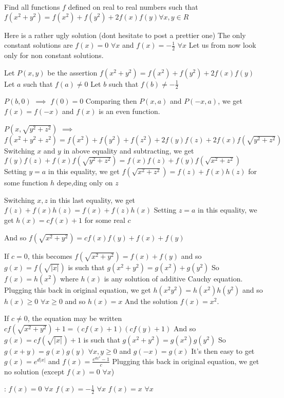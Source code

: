 \begin{solution}
	\begin{tcolorbox}Find all functions $f$ defined on real to real numbers  such that
$f(x^2+y^2)=f(x^2)+f(y^2)+2f(x)f(y) \forall x, y \in  R$\end{tcolorbox}
Here is a rather ugly solution (dont hesitate to post a prettier one)
The only constant solutions are $f(x)=0$ $\forall x$ and $f(x)=-\frac 12$ $\forall x$
Let us from now look only for non constant solutions.

Let $P(x,y)$ be the assertion $f(x^2+y^2)=f(x^2)+f(y^2)+2f(x)f(y)$
Let $a$ such that $f(a)\ne 0$
Let $b$ such that $f(b)\ne -\frac 12$

$P(b,0)$ $\implies$ $f(0)=0$
Comparing then $P(x,a)$ and $P(-x,a)$, we get $f(x)=f(-x)$ and $f(x)$ is an even function.

$P(x,\sqrt{y^2+z^2})$ $\implies$ $f(x^2+y^2+z^2)=f(x^2)+f(y^2)+f(z^2)+2f(y)f(z)+2f(x)f(\sqrt{y^2+z^2})$
Switching $x$ and $y$ in above equality and subtracting, we get $f(y)f(z)+f(x)f(\sqrt{y^2+z^2})=f(x)f(z)+f(y)f(\sqrt{x^2+z^2})$
Setting $y=a$ in this equality, we get $f(\sqrt{x^2+z^2})=f(z)+f(x)h(z)$ for some function $h$ depe,ding only on $z$

Switching $x,z$ in this last equality, we get $f(z)+f(x)h(z)=f(x)+f(z)h(x)$
Setting $z=a$ in this equality, we get $h(x)=cf(x)+1$ for some real $c$

And so $f(\sqrt{x^2+y^2})=cf(x)f(y)+f(x)+f(y)$

If $c=0$, this becomes $f(\sqrt{x^2+y^2})=f(x)+f(y)$ and so $g(x)=f(\sqrt {|x|})$ is such that $g(x^2+y^2)=g(x^2)+g(y^2)$
So $f(x)=h(x^2)$ where $h(x)$ is any solution of additive Cauchy equation.
Plugging this back in original equation, we get $h(x^2y^2)=h(x^2)h(y^2)$ and so $h(x)\ge 0$ $\forall x\ge 0$ and so $h(x)=x$
And the solution $f(x)=x^2$.

If $c\ne 0$, the equation may be written $cf(\sqrt{x^2+y^2})+1=(cf(x)+1)(cf(y)+1)$
And so $g(x)=cf(\sqrt{|x|})+1$ is such that $g(x^2+y^2)=g(x^2)g(y^2)$
So $g(x+y)=g(x)g(y)$ $\forall x,y\ge 0$ and $g(-x)=g(x)$
It's then easy to get $g(x)=e^{d|x|}$ and $f(x)=\frac{e^{dx^2}-1}c$
Plugging this back in original equation, we get no solution (except $f(x)=0$ $\forall x$)

 :
$f(x)=0$ $\forall x$
$f(x)=-\frac 12$ $\forall x$
$f(x)=x$ $\forall x$
\end{solution}



